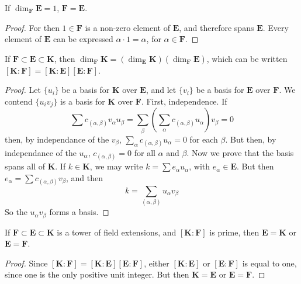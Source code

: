 \begin{lemma}
    If $\dim_{\mathbf{F}} \mathbf{E} = 1$, $\mathbf{F} = \mathbf{E}$.
\end{lemma}
\begin{proof}
    For then $1 \in \mathbf{F}$ is a non-zero element of $\mathbf{E}$, and therefore spans $\mathbf{E}$. Every element of $\mathbf{E}$ can be expressed $\alpha \cdot 1 = \alpha$, for $\alpha \in \mathbf{F}$.
\end{proof}

\begin{lemma}
    If $\mathbf{F} \subset \mathbf{E} \subset \mathbf{K}$, then $\dim_{\mathbf{F}} \mathbf{K} = (\dim_{\mathbf{E}} \mathbf{K}) (\dim_{\mathbf{F}} \mathbf{E})$, which can be written $[\mathbf{K}:\mathbf{F}] = [\mathbf{K}: \mathbf{E}][\mathbf{E}: \mathbf{F}]$.
\end{lemma}
\begin{proof}
    Let $\{ u_i \}$ be a basis for $\mathbf{K}$ over $\mathbf{E}$, and let $\{ v_i \}$ be a basis for $\mathbf{E}$ over $\mathbf{F}$. We contend $\{ u_i v_j \}$ is a basis for $\mathbf{K}$ over $\mathbf{F}$. First, independence. If
    \[ \sum c_{(\alpha,\beta)} v_\alpha u_\beta = \sum_\beta \left( \sum_\alpha c_{(\alpha, \beta)} u_\alpha \right) v_\beta = 0 \]
    then, by independance of the $v_\beta$, $\sum_\alpha c_{(\alpha, \beta)} u_\alpha = 0$ for each $\beta$. But then, by independance of the $u_\alpha$, $c_{(\alpha, \beta)} = 0$ for all $\alpha$ and $\beta$. Now we prove that the basis spans all of $\mathbf{K}$. If $k \in \mathbf{K}$, we may write $k = \sum e_\alpha u_\alpha$, with $e_\alpha \in \mathbf{E}$. But then $e_\alpha = \sum c_{(\alpha, \beta)} v_\beta$, and then
    \[ k = \sum_{(\alpha, \beta)} u_\alpha v_\beta \]
    So the $u_\alpha v_\beta$ forms a basis.
\end{proof}

\begin{corollary}
    If $\mathbf{F} \subset \mathbf{E} \subset \mathbf{K}$ is a tower of field extensions, and $[\mathbf{K}: \mathbf{F}]$ is prime, then $\mathbf{E} = \mathbf{K}$ or $\mathbf{E} = \mathbf{F}$.
\end{corollary}
\begin{proof}
    Since $[\mathbf{K}: \mathbf{F}] = [\mathbf{K}: \mathbf{E}] [\mathbf{E}: \mathbf{F}]$, either $[\mathbf{K}: \mathbf{E}]$ or $[\mathbf{E}: \mathbf{F}]$ is equal to one, since one is the only positive unit integer. But then $\mathbf{K} = \mathbf{E}$ or $\mathbf{E} = \mathbf{F}$.
\end{proof}

